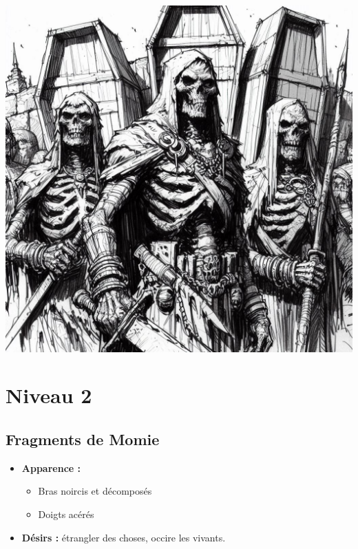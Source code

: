 \vfill\
\begin{center}
  \vspace*{0.2\textheight}
  \includegraphics[width=\linewidth]{pics/squelette.jpg}
\end{center}
\vfill

\pagebreak
\section{Niveau 2}
\subsection{Fragments de Momie}\label{monster:s11}
\begin{itemize}
  \item \textbf{Apparence :}
  \begin{itemize}
    \item Bras noircis et décomposés
    \item Doigts acérés
  \end{itemize}
  \item \textbf{ Désirs :}  étrangler des choses, occire les vivants.
\end{itemize}


